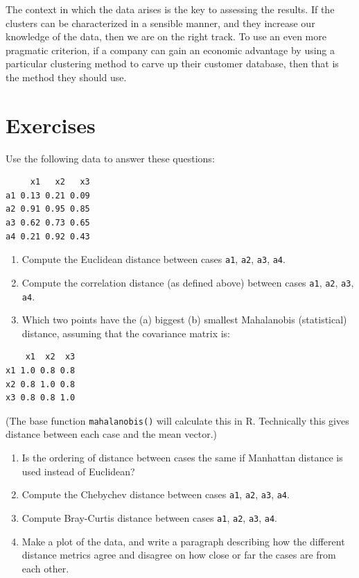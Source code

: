 \documentclass[
  letterpaper,
]{krantz}
\begin{document}
The context in which the data arises is the key to assessing the
results. If the clusters can be characterized in a sensible manner, and
they increase our knowledge of the data, then we are on the right track.
To use an even more pragmatic criterion, if a company can gain an
economic advantage by using a particular clustering method to carve up
their customer database, then that is the method they should use.

\section*{Exercises}\label{exercises-5}


Use the following data to answer these questions:

\begin{verbatim}
     x1   x2   x3
a1 0.13 0.21 0.09
a2 0.91 0.95 0.85
a3 0.62 0.73 0.65
a4 0.21 0.92 0.43
\end{verbatim}

\begin{enumerate}
\def\labelenumi{\arabic{enumi}.}
\item
  Compute the Euclidean distance between cases \texttt{a1}, \texttt{a2},
  \texttt{a3}, \texttt{a4}.
\item
  Compute the correlation distance (as defined above) between cases
  \texttt{a1}, \texttt{a2}, \texttt{a3}, \texttt{a4}.
\item
  Which two points have the (a) biggest (b) smallest Mahalanobis
  (statistical) distance, assuming that the covariance matrix is:
\end{enumerate}

\begin{verbatim}
    x1  x2  x3
x1 1.0 0.8 0.8
x2 0.8 1.0 0.8
x3 0.8 0.8 1.0
\end{verbatim}

(The base function \texttt{mahalanobis()} will calculate this in R.
Technically this gives distance between each case and the mean vector.)

\begin{enumerate}
\def\labelenumi{\arabic{enumi}.}
\setcounter{enumi}{3}
\item
  Is the ordering of distance between cases the same if Manhattan
  distance is used instead of Euclidean?
\item
  Compute the Chebychev distance between cases \texttt{a1}, \texttt{a2},
  \texttt{a3}, \texttt{a4}.
\item
  Compute Bray-Curtis distance between cases \texttt{a1}, \texttt{a2},
  \texttt{a3}, \texttt{a4}.
\item
  Make a plot of the data, and write a paragraph describing how the
  different distance metrics agree and disagree on how close or far the
  cases are from each other.
\end{enumerate}
\end{document}

